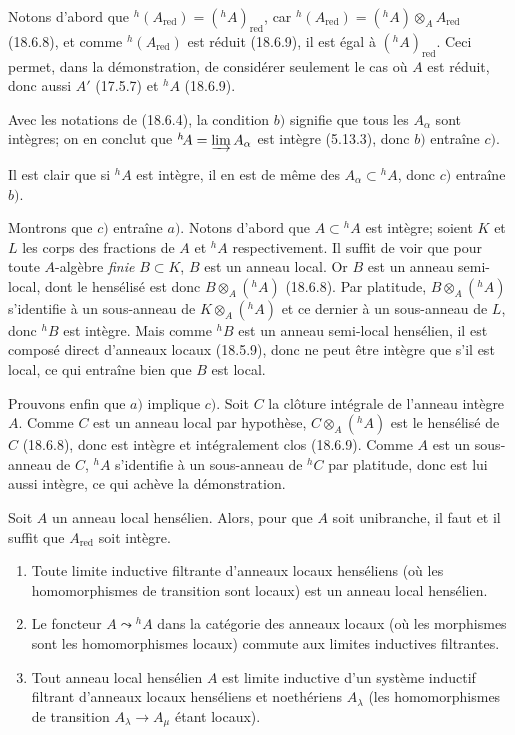 Notons d'abord que ${}^h(A_{\mathrm{red}})=({}^h\!A)_{\mathrm{red}}$, car ${}^h(A_{\mathrm{red}})=({}^h\!A)\otimes_A A_{\mathrm{red}}$ (18.6.8), et comme ${}^h(A_{\mathrm{red}})$ est réduit (18.6.9), il est égal à $({}^h\!A)_{\mathrm{red}}$. Ceci permet, dans la démonstration, de considérer seulement le cas où $A$ est réduit, donc aussi $A'$ (17.5.7) et ${}^h\!A$ (18.6.9).

Avec les notations de (18.6.4), la condition $b)$ signifie que tous les $A_\alpha$ sont intègres; on en conclut que ${}^h\!A=\varinjlim A_\alpha$ est intègre (5.13.3), donc $b)$ entraîne $c)$.

Il est clair que si ${}^h\!A$ est intègre, il en est de même des $A_\alpha\subset{}^h\!A$, donc $c)$ entraîne $b)$.

Montrons que $c)$ entraîne $a)$. Notons d'abord que $A\subset{}^h\!A$ est intègre; soient $K$ et $L$ les corps des fractions de $A$ et ${}^h\!A$ respectivement. Il suffit de voir que pour toute $A$-algèbre \emph{finie} $B\subset K$, $B$ est un anneau local. Or $B$ est un anneau semi-local, dont le hensélisé est donc $B\otimes_A({}^h\!A)$ (18.6.8). Par platitude, $B\otimes_A({}^h\!A)$ s'identifie à un sous-anneau de $K\otimes_A({}^h\!A)$ et ce dernier à un sous-anneau de $L$, donc ${}^h\!B$ est intègre. Mais comme ${}^h\!B$ est un anneau semi-local hensélien, il est composé direct d'anneaux locaux (18.5.9), donc ne peut être intègre que s'il est local, ce qui entraîne bien que $B$ est local.

Prouvons enfin que $a)$ implique $c)$. Soit $C$ la clôture intégrale de l'anneau intègre $A$. Comme $C$ est un anneau local par hypothèse, $C\otimes_A({}^h\!A)$ est le hensélisé de $C$ (18.6.8), donc est intègre et intégralement clos (18.6.9). Comme $A$ est un sous-anneau de $C$, ${}^h\!A$ s'identifie à un sous-anneau de ${}^h\!C$ par platitude, donc est lui aussi intègre, ce qui achève la démonstration.

\begin{corollary}[18.6.13]
\label{IV.18.6.13}
Soit $A$ un anneau local hensélien. Alors, pour que $A$ soit unibranche, il faut et il suffit que $A_{\mathrm{red}}$ soit intègre.
\end{corollary}

\begin{proposition}[18.6.14]
\label{IV.18.6.14}
\begin{enumerate}
  \item[(i)] Toute limite inductive filtrante d'anneaux locaux henséliens (où les homomorphismes de transition sont locaux) est un anneau local hensélien.
  \item[(ii)] Le foncteur $A\leadsto{}^h\!A$ dans la catégorie des anneaux locaux (où les morphismes sont les homomorphismes locaux) commute aux limites inductives filtrantes.
  \item[(iii)] Tout anneau local hensélien $A$ est limite inductive d'un système inductif filtrant d'anneaux locaux henséliens et noethériens $A_\lambda$ (les homomorphismes de transition $A_\lambda\to A_\mu$ étant locaux).
\end{enumerate}
\end{proposition}

